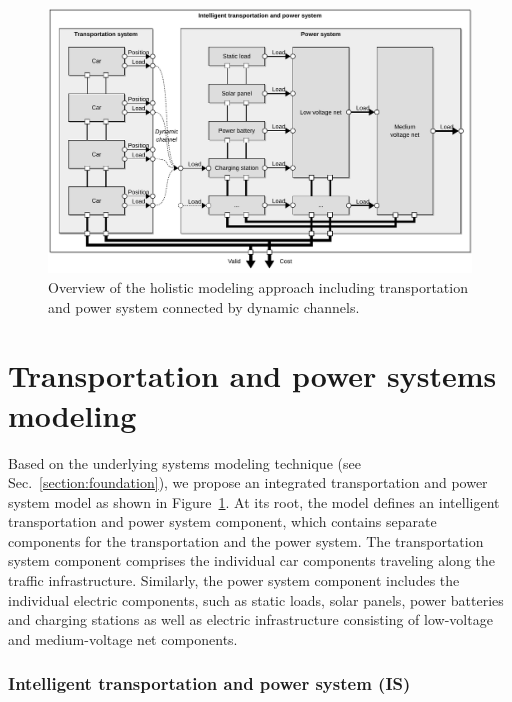 \begin{figure}[b]
	\centering
	\includegraphics[width=\textwidth]{../gfx/model.pdf}
	\caption{Overview of the holistic modeling approach including transportation and power system connected by dynamic channels.}
	\label{fig:model}
\end{figure}

\section{Transportation and power systems modeling}
\label{section:contribution}

Based on the underlying systems modeling technique (see Sec.~\ref{section:foundation}), we propose an integrated transportation and power system model as shown in Figure~\ref{fig:model}. At its root, the model defines an intelligent transportation and power system component, which contains separate components for the transportation and the power system. The transportation system component comprises the individual car components traveling along the traffic infrastructure. Similarly, the power system component includes the individual electric components, such as static loads, solar panels, power batteries and charging stations as well as electric infrastructure consisting of low-voltage and medium-voltage net components. 

\subsubsection*{Intelligent transportation and power system (IS)}
\label{section:intelligent_system}

